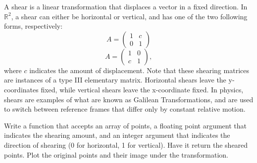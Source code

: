 A shear is a linear transformation that displaces a vector in a fixed direction.
In $\mathbb{R}^2$, a shear can either be horizontal or vertical, and has one of
the two following forms, respectively:
\[
A = \begin{pmatrix}
1 & c \\
0 & 1
\end{pmatrix}
\]
\[
A = \begin{pmatrix}
1 & 0 \\
c & 1
\end{pmatrix},
\]
where $c$ indicates the amount of displacement.  Note that
these shearing matrices are instances of a type III elementary matrix. Horizontal
shears leave the y-coordinates fixed, while vertical shears leave the x-coordinate
fixed. In physics, shears are examples of what are known as Galilean Transformations, and are used
to switch between reference frames that differ only by constant relative motion.

\begin{problem}
Write a function that accepts an array of points, a floating point argument that
indicates the shearing amount, and an integer argument
that indicates the direction of shearing (0 for horizontal, 1 for vertical).
Have it return the sheared points.
Plot the original points and their image under the transformation.
\end{problem}

